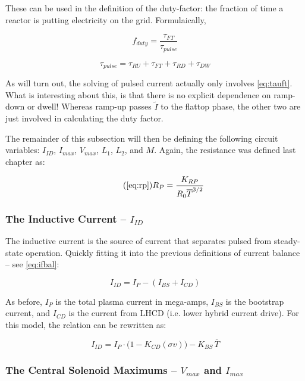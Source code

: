 These can be used in the definition of the duty-factor: the fraction of time a reactor is putting electricity on the grid. Formulaically,

\begin{equation}
	\label{eq:duty}
	f_{duty} = \frac{\tau_{FT}}{\tau_{pulse}}
\end{equation}

\begin{equation}
	\tau_{pulse} = \tau_{RU} + \tau_{FT} + \tau_{RD} + \tau_{DW}
\end{equation}

As will turn out, the solving of pulsed current actually only involves \cref{eq:tauft}. What is interesting about this, is that there is no explicit dependence on ramp-down or dwell! Whereas ramp-up passes $\tilde I$ to the flattop phase, the other two are just involved in calculating the duty factor.

The remainder of this subsection will then be defining the following circuit variables: $I_{ID}$, $I_{max}$, $V_{max}$, $L_1$, $L_2$, and $M$. Again, the resistance was defined last chapter as:

\begin{equation}
	\tag{\ref{eq:rp}}
	R_P = \frac{K_{RP}}{R_0 \overline T ^ {3/2}}
\end{equation}

\subsubsection{The Inductive Current -- $I_{ID}$}

The inductive current is the source of current that separates pulsed from steady-state operation. Quickly fitting it into the previous definitions of current balance -- see \cref{eq:ifbal}:

\begin{equation}
	I_{ID} = I_P - ( I_{BS} + I_{CD} )
\end{equation}

As before, $I_P$ is the total plasma current in mega-amps, $I_{BS}$ is the bootstrap current, and $I_{CD}$ is the current from LHCD (i.e. lower hybrid current drive). For this model, the relation can be rewritten as:

\begin{equation}
	I_{ID} = I_P \cdot \Big( 1 - K_{CD} ( \sigma v ) \Big) - K_{BS} \, \overline T
\end{equation}

\subsubsection{The Central Solenoid Maximums -- $V_{max}$ and $I_{max}$}

